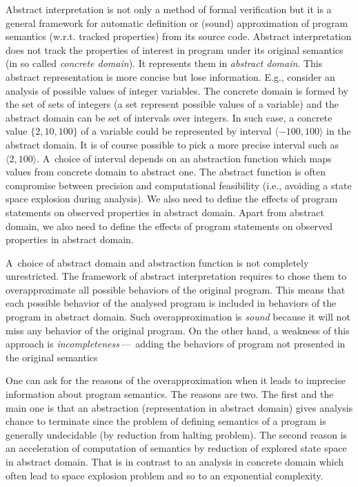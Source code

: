 \documentclass[a4paper, 12pt]{article}
\newcommand{\interval}[2]{\langle #1,#2 \rangle}
\begin{document}
Abstract interpretation is not only a method of formal verification but
it is a general framework for automatic definition or (sound) approximation of
program semantics (w.r.t. tracked properties) from its source code.
Abstract interpretation does not track the properties of interest
in program under its original semantics (in so called \emph{concrete domain}).
It represents them in \emph{abstract domain}.
This abstract representation is more concise but lose information.
E.g., consider an analysis of possible values of integer variables.
The concrete domain is formed by the set of sets of integers (a set represent possible
values of a variable) and the abstract domain can be set of intervals over integers.
In such case, a concrete value $\{2,10,100\}$ of a variable could
be represented by interval $\interval{-100}{100}$ in the abstract domain.
It is of course possible to pick a more precise interval such as $\interval{2}{100}$.
A~choice of interval depends on an abstraction function
which maps values from concrete domain to abstract one.
The abstract function is often compromise between precision and computational
feasibility (i.e., avoiding a state space explosion during analysis).
We also need to define the effects of program statements
on observed properties in abstract domain.
Apart from abstract domain, we also need to define the effects
of program statements on observed properties in abstract domain.

A~choice of abstract domain and abstraction function is not completely unrestricted.
The framework of abstract interpretation requires to chose them to
overapproximate all possible behaviors of the original program.
This means that each possible behavior of the analysed program is included in
behaviors of the program in abstract domain.
Such overapproximation is \emph{sound} because it will not miss any
behavior of the original program.
On the other hand, a weakness of this approach is \emph{incompleteness}\,---\,
adding the behaviors of program not presented in the original semantics

One can ask for the reasons of the overapproximation when it leads to
imprecise information about program semantics.
The reasons are two.
The first and the main one is that an abstraction (representation in abstract domain) gives
analysis chance to terminate since the problem of defining semantics of a program is
generally undecidable (by reduction from halting problem).
The second reason is an acceleration of computation of semantics
by reduction of explored state space in abstract domain.
That is in contrast to an analysis in concrete domain
which often lead to space explosion problem and so to an exponential complexity.
\end{document}
